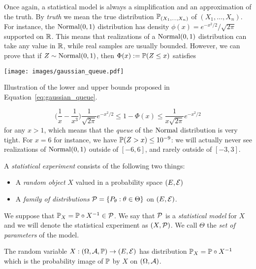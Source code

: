 Once again, a statistical model is always a simplification and an approximation of the truth.
By \emph{truth} we mean the true distribution $\P_{(X_1, \ldots, X_n)}$ of $(X_1, \ldots, X_n)$.
For instance, the $\nor(0, 1)$ distribution has density $\phi(x) = e^{-x^2/2} / \sqrt{2 \pi}$ supported on $\R$. 
This means that realizations of a $\nor(0, 1)$ distribution can take any value in $\R$, while real samples are usually bounded.
However, we can prove that if $Z \sim \nor(0, 1)$, then $\Phi(x) := \P(Z \leq x)$ satisfies
\begin{marginfigure}
	\texttt{[image: images/gaussian\_queue.pdf]}
	\caption{Illustration of the lower and upper bounds proposed in Equation~\eqref{eq:gaussian_queue}.}
\end{marginfigure}%
\begin{equation}
	\label{eq:gaussian_queue}
	\Big( \frac 1x - \frac{1}{x^3} \Big) \frac{1}{\sqrt{2\pi}} e^{-x^2 / 2} \leq 1 - \Phi(x) \leq \frac{1}{x \sqrt{2 \pi}} e^{-x^2 / 2}
\end{equation}
for any $x > 1$, which means that the \emph{queue}%
%
of the $\nor$ distribution is very tight.
For $x=6$ for instance, we have $\P(Z > x) \leq 10^{-9}$: we will actually never see realizations of $\nor(0, 1)$ outside of $[-6, 6]$, and rarely outside of $[-3, 3]$.
\begin{definition}
	\label{def:statistical_experiment}
	A \emph{statistical experiment} consists of the following two things:
	\begin{itemize}
		\item A \emph{random object} $X$ valued in a probability space $(E, \cE)$
		\item A \emph{family of distributions} $\cP = \{ P_\theta : \theta \in \Theta\}$ on $(E, \cE)$.
	\end{itemize}
	We suppose that $\P_X = \P \circ X^{-1} \in \cP$. We say that $\cP$ is a \emph{statistical model} for $X$ and we will denote the statistical experiment as $(X, \cP)$.
	We call $\Theta$ the \emph{set of parameters} of the model.
\end{definition}
The random variable $X : (\Omega, \cA, \P) \rightarrow (E, \cE)$ has distribution $\P_X = \P \circ X^{-1}$ which is the probability image of $\P$ by $X$ on $(\Omega, \cA)$.
